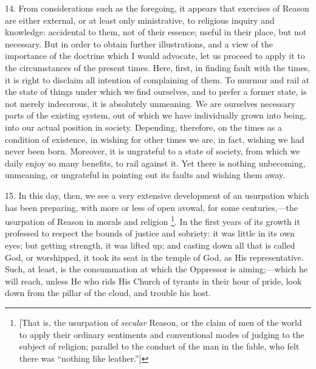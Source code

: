 14. From considerations such as the foregoing, it appears that
exercises of Reason are either external, or at least only ministrative,
to religious inquiry and knowledge: accidental to them, not of their
essence; useful in their place, but not necessary. But in order to
obtain further illustrations, and a view of the importance of the
doctrine which I would advocate, let us proceed to apply it to the
circumstances of the present times. Here, first, in finding fault with
the times, it is right to disclaim all intention of complaining of
them. To murmur and rail at the state of things under which we find
ourselves, and to prefer a former state, is not merely indecorous, it
is absolutely unmeaning. We are ourselves necessary parts of the
existing system, out of which we have individually grown into being,
into our actual position in society. Depending, therefore, on the
times as a condition of existence, in wishing for other times we are,
in fact, wishing we had never been born. Moreover, it is ungrateful to
a state of society, from which we daily enjoy so many benefits, to
rail against it. Yet there is nothing unbecoming, unmeaning, or
ungrateful in pointing out its faults and wishing them away.

15. In this day, then, we see a very extensive development of an
usurpation which has been preparing, with more or less of open avowal,
for some centuries,—the usurpation of Reason in morals and religion
\footnote{[That is, the
usurpation of \emph{secular} Reason, or the claim of men of the world
to apply their ordinary sentiments and conventional modes of judging
to the subject of religion; parallel to the conduct of the man in the
fable, who felt there was ``nothing like leather.'']}. In the first years of
its growth it professed to respect the bounds of justice and sobriety:
it was little in its own eyes; but getting strength, it was lifted up;
and casting down all that is called God, or worshipped, it took its
seat in the temple of God, as His representative. Such, at least, is
the consummation at which the Oppressor is aiming;—which he will
reach, unless He who rids His Church of tyrants in their hour of
pride, look down from the pillar of the cloud, and trouble his host.

